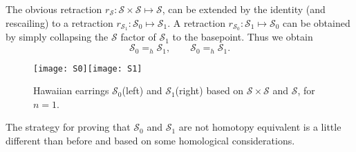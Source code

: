 \documentclass[reqno,12pt]{amsart}
\theoremstyle{ourremark}
\numberwithin{equation}{section}
\numberwithin{theorem}{section}
\begin{document}
 The obvious retraction $r_{\mathcal{S}}:\mathcal{S}\times \mathcal{S}\longmapsto \mathcal{S}$, can be extended by the identity (and rescailing) to a retraction $r_{\mathcal{S}_1}:\mathcal{S}_0\longmapsto \mathcal{S}_1$. A retraction $r_{\mathcal{S}_0}:\mathcal{S}_1\longmapsto \mathcal{S}_0$ can be obtained by simply collapsing the $\mathcal{S}$ factor of $\mathcal{S}_1$ to the basepoint. Thus we obtain 
\[
\mathcal{S}_0=_h \mathcal{S}_1,\qquad \mathcal{S}_0=_h \mathcal{S}_1.
\]
\begin{figure}[!ht] 
  \centering
   \texttt{[image: S0]}\quad \texttt{[image: S1]}
  \caption{Hawaiian earrings $\mathcal{S}_0$(left) and $\mathcal{S}_1$(right) based on $\mathcal{S}\times \mathcal{S}$ and $\mathcal{S}$, for $n=1$.} \label{fig:S1-S0} 
\end{figure} 
The strategy for proving that $\mathcal{S}_0$ and $\mathcal{S}_1$ are not homotopy equivalent is a little different than before and based on 
some homological considerations. 
\end{document}
